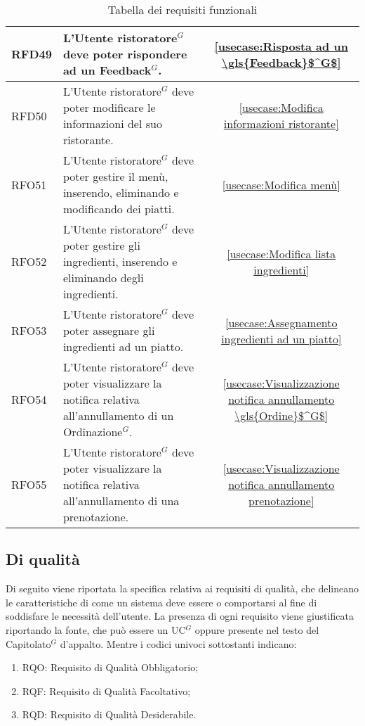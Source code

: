 \begin{table}[H]
\begin{tabularx}{\textwidth}{l|X|c}
		\hline
		RFD49       & L'\gls{Utente ristoratore}$^G$ deve poter rispondere ad un \gls{Feedback}$^G$.                                                              & \autoref{usecase:Risposta ad un \gls{Feedback}$^G$}            \\
		\hline
		RFD50       & L'\gls{Utente ristoratore}$^G$ deve poter modificare le informazioni del suo ristorante.                                          & \autoref{usecase:Modifica informazioni ristorante}   \\
		\hline
		RFO51       & L'\gls{Utente ristoratore}$^G$ deve poter gestire il menù, inserendo, eliminando e modificando dei piatti.                        & \autoref{usecase:Modifica menù}                      \\
		\hline
		RFO52       & L'\gls{Utente ristoratore}$^G$ deve poter gestire gli ingredienti, inserendo e eliminando degli ingredienti.                      & \autoref{usecase:Modifica lista ingredienti}         \\
		\hline
		RFO53       & L'\gls{Utente ristoratore}$^G$ deve poter assegnare gli ingredienti ad un piatto.                      							  & \autoref{usecase:Assegnamento ingredienti ad un piatto}         \\
		\hline
		RFO54       & L'\gls{Utente ristoratore}$^G$ deve poter visualizzare la notifica relativa all'annullamento di un \gls{Ordinazione}$^G$.                   & \autoref{usecase:Visualizzazione notifica annullamento \gls{Ordine}$^G$}         \\
		\hline
		RFO55       & L'\gls{Utente ristoratore}$^G$ deve poter visualizzare la notifica relativa all'annullamento di una prenotazione.                  & \autoref{usecase:Visualizzazione notifica annullamento prenotazione}         \\
	\end{tabularx}
	\caption{Tabella dei requisiti funzionali}
\end{table}


\subsection{Di qualità}

Di seguito viene riportata la specifica relativa ai requisiti di qualità, che delineano le caratteristiche di come un sistema
deve essere o comportarsi al fine di soddisfare le necessità dell'utente.
La presenza di ogni requisito viene giustificata riportando la fonte, che può essere un \gls{UC}$^G$ oppure presente
nel testo del \gls{Capitolato}$^G$ d'appalto. Mentre i codici univoci sottostanti indicano:
\begin{enumerate}
	\item RQO: Requisito di Qualità Obbligatorio;
	\item RQF: Requisito di Qualità Facoltativo;
	\item RQD: Requisito di Qualità Desiderabile.
\end{enumerate}

